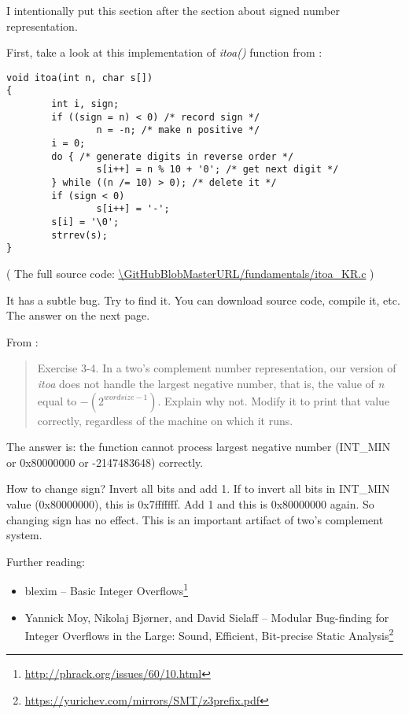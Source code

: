 
I intentionally put this section after the section about signed number representation.

First, take a look at this implementation of \emph{itoa()} function from \InSqBrackets{\KRBook}:

\begin{lstlisting}[style=customc]
void itoa(int n, char s[])
{
        int i, sign;
        if ((sign = n) < 0) /* record sign */
                n = -n; /* make n positive */
        i = 0;
        do { /* generate digits in reverse order */
                s[i++] = n % 10 + '0'; /* get next digit */
        } while ((n /= 10) > 0); /* delete it */
        if (sign < 0)
                s[i++] = '-';
        s[i] = '\0';
        strrev(s);
}
\end{lstlisting}

( The full source code: \url{\GitHubBlobMasterURL/fundamentals/itoa_KR.c} )

It has a subtle bug. Try to find it. You can download source code, compile it, etc.
The answer on the next page.

\clearpage

From \InSqBrackets{\KRBook}:

\begin{framed}
\begin{quotation}
Exercise 3-4. In a two's complement number representation, our version of \emph{itoa}
does not handle the largest negative number, that is, the value
of \emph{n} equal to $-(2^{wordsize-1})$. Explain why not. Modify it to
print that value correctly, regardless of the machine on which
it runs.
\end{quotation}
\end{framed}

The answer is: the function cannot process largest negative number (INT\_MIN or 0x80000000 or -2147483648) correctly.

How to change sign? Invert all bits and add 1.
If to invert all bits in INT\_MIN value (0x80000000), this is 0x7fffffff. Add 1 and this is 0x80000000 again.
So changing sign has no effect.
This is an important artifact of two's complement system.

Further reading:

\begin{itemize}
\item blexim -- Basic Integer Overflows\footnote{\url{http://phrack.org/issues/60/10.html}}

\item Yannick Moy, Nikolaj Bjørner, and David Sielaff -- Modular Bug-finding for Integer Overflows in the Large: Sound, Efficient, Bit-precise Static Analysis\footnote{\url{https://yurichev.com/mirrors/SMT/z3prefix.pdf}}
\end{itemize}

